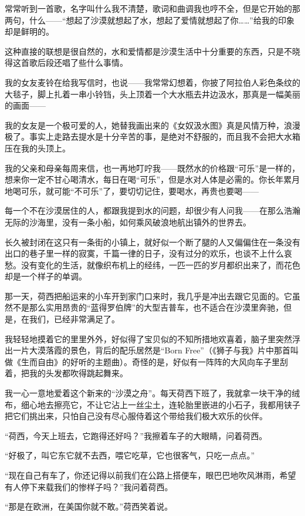 \par 常常听到一首歌，名字叫什么我不清楚，歌词和曲调我也哼不全，但是它开始的那两句，什么——“想起了沙漠就想起了水，想起了爱情就想起了你……”给我的印象却是鲜明的。
\par 这种直接的联想是很自然的，水和爱情都是沙漠生活中十分重要的东西，只是不晓得这首歌后段还唱了些什么事情。
\par 我的女友麦铃在给我写信时，也说——我常常幻想着，你披了阿拉伯人彩色条纹的大毯子，脚上扎着一串小铃铛，头上顶着一个大水瓶去井边汲水，那真是一幅美丽的画面——
\par 我的女友是一个极可爱的人，她替我画出来的《女奴汲水图》真是风情万种，浪漫极了。事实上走路去提水是十分辛苦的事，是绝对不舒服的，而且我不会把大水箱压在我的头顶上。
\par 我的父亲和母亲每周来信，也一再地叮咛我——既然水的价格跟“可乐”是一样的，想来你一定不甘心喝清水，每日在喝“可乐”，但是水对人体是必需的。你长年累月地喝可乐，就可能“不可乐”了，要切切记住，要喝水，再贵也要喝——
\par 每一个不在沙漠居住的人，都跟我提到水的问题，却很少有人问我——在那么浩瀚无际的沙海里，没有一条小船，如何乘风破浪地航出镇外的世界去。
\par 长久被封闭在这只有一条街的小镇上，就好似一个断了腿的人又偏偏住在一条没有出口的巷子里一样的寂寞，千篇一律的日子，没有过分的欢乐，也谈不上什么哀愁。没有变化的生活，就像织布机上的经纬，一匹一匹的岁月都织出来了，而花色却是一个样子的单调。
\par 那一天，荷西把船运来的小车开到家门口来时，我几乎是冲出去跟它见面的。它虽然不是那么实用昂贵的“蓝得罗伯牌”的大型吉普车，也不适合在沙漠里奔驰，但是，在我们，已经非常满足了。
\par 我轻轻地摸着它的里里外外，好似得了宝贝似的不知所措地欢喜着，脑子里突然浮出一片大漠落霞的景色，背后的配乐居然是“Born Free”（《狮子与我》片中那首叫做《生而自由》的好听的主题曲）。奇怪的是，好似有一阵阵的大风向车子里刮着，把我的头发都吹得跳起舞来。
\par 我一心一意地爱着这个新来的“沙漠之舟”。每天荷西下班了，我就拿一块干净的绒布，细心地去擦亮它，不让它沾上一丝尘土，连轮胎里嵌进的小石子，我都用铗子把它们挑出来，只怕自己没有尽心服侍着这个带给我们极大欢乐的伙伴。
\par “荷西，今天上班去，它跑得还好吗？”我擦着车子的大眼睛，问着荷西。
\par “好极了，叫它东它就不去西，喂它吃草，它也很客气，只吃一点点。”
\par “现在自己有车了，你还记得以前我们在公路上搭便车，眼巴巴地吹风淋雨，希望有人停下来载我们的惨样子吗？”我问着荷西。
\par “那是在欧洲，在美国你就不敢。”荷西笑着说。
